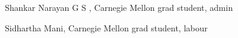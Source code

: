 
\begin{DoxyEnumerate}
\item Shankar Narayan G S , Carnegie Mellon grad student, admin \par

\item Sidhartha Mani, Carnegie Mellon grad student, labour \par
 
\end{DoxyEnumerate}